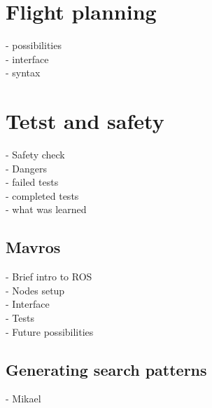 \section{Flight planning}
- possibilities\\
- interface\\
- syntax\\
\section{Tetst and safety}
- Safety check\\
- Dangers\\
- failed tests\\
- completed tests\\
- what was learned\\

\subsection{Mavros}
- Brief intro to ROS\\
- Nodes setup\\
- Interface\\
- Tests\\
- Future possibilities\\
\subsection{Generating search patterns}
- Mikael\\
\newpage
